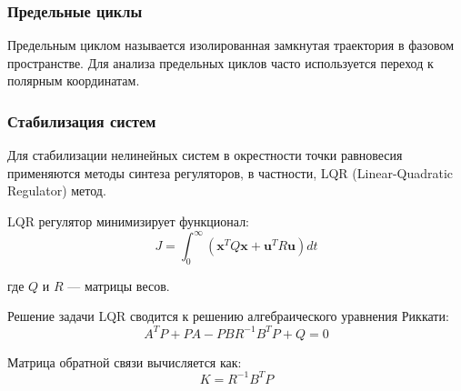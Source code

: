 \subsubsection*{Предельные циклы}

Предельным циклом называется изолированная замкнутая траектория в фазовом пространстве. Для анализа предельных циклов часто используется переход к полярным координатам.

\subsubsection*{Стабилизация систем}

Для стабилизации нелинейных систем в окрестности точки равновесия применяются методы синтеза регуляторов, в частности, LQR (Linear-Quadratic Regulator) метод.

LQR регулятор минимизирует функционал:
$$J = \int_0^{\infty} (\mathbf{x}^T Q \mathbf{x} + \mathbf{u}^T R \mathbf{u}) dt$$

где $Q$ и $R$ --- матрицы весов.

Решение задачи LQR сводится к решению алгебраического уравнения Риккати:
$$A^T P + PA - PBR^{-1}B^T P + Q = 0$$

Матрица обратной связи вычисляется как:
$$K = R^{-1}B^T P$$
